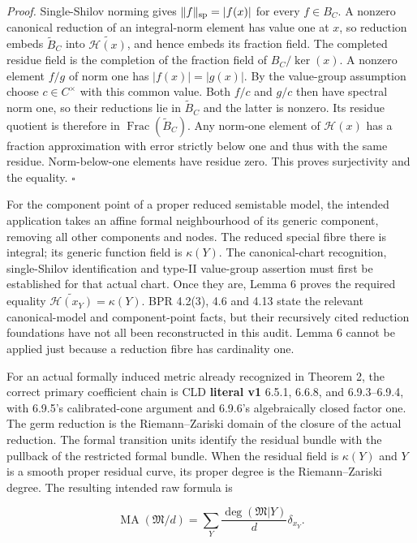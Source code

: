 \documentclass[
  11pt,
]{article}
\begin{document}
\emph{Proof.} Single-Shilov norming gives \(\|f\|_{\rm sp}=|f(x)|\) for
every \(f\in B_C\). A nonzero canonical reduction of an integral-norm
element has value one at \(x\), so reduction embeds \(\widetilde B_C\)
into \(\widetilde{\mathcal H(x)}\), and hence embeds its fraction field.
The completed residue field is the completion of the fraction field of
\(B_C/\ker(x)\). A nonzero element \(f/g\) of norm one has
\(|f(x)|=|g(x)|\). By the value-group assumption choose
\(c\in C^\times\) with this common value. Both \(f/c\) and \(g/c\) then
have spectral norm one, so their reductions lie in \(\widetilde B_C\)
and the latter is nonzero. Its residue quotient is therefore in
\(\operatorname{Frac}(\widetilde B_C)\). Any norm-one element of
\(\mathcal H(x)\) has a fraction approximation with error strictly below
one and thus with the same residue. Norm-below-one elements have residue
zero. This proves surjectivity and the equality. \(\square\)

For the component point of a proper reduced semistable model, the
intended application takes an affine formal neighbourhood of its generic
component, removing all other components and nodes. The reduced special
fibre there is integral; its generic function field is \(\kappa(Y)\).
The canonical-chart recognition, single-Shilov identification and
type-II value-group assertion must first be established for that actual
chart. Once they are, Lemma 6 proves the required equality
\(\widetilde{\mathcal H(x_Y)}=\kappa(Y)\). BPR 4.2(3), 4.6 and 4.13
state the relevant canonical-model and component-point facts, but their
recursively cited reduction foundations have not all been reconstructed
in this audit. Lemma 6 cannot be applied just because a reduction fibre
has cardinality one.

For an actual formally induced metric already recognized in Theorem 2,
the correct primary coefficient chain is CLD \textbf{literal v1} 6.5.1,
6.6.8, and 6.9.3--6.9.4, with 6.9.5's calibrated-cone argument and
6.9.6's algebraically closed factor one. The germ reduction is the
Riemann--Zariski domain of the closure of the actual reduction. The
formal transition units identify the residual bundle with the pullback
of the restricted formal bundle. When the residual field is
\(\kappa(Y)\) and \(Y\) is a smooth proper residual curve, its proper
degree is the Riemann--Zariski degree. The resulting intended raw
formula is

\[
 \operatorname{MA}(\mathfrak M/d)
   =\sum_Y\frac{\deg(\mathfrak M|Y)}d\delta_{x_Y}.
\]
\end{document}
